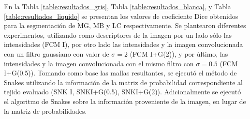 En la Tabla \ref{table:resultados_gris}, Tabla \ref{table:resultados_blanca}, y Tabla \ref{table:resultados_liquido} se presentan los valores de coeficiente Dice obtenidos para la segmentación de MG, MB y LC respectivamente. Se plantearon diferentes experimentos, utilizando como descriptores de la imagen por un lado sólo las intensidades (FCM I), por otro lado las intensidades y la imagen convolucionada con un filtro gaussiano con valor de $\sigma = 2$ (FCM I+G(2)), y por último, las intensidades y la imagen convolucionada con el mismo filtro con $\sigma = 0.5$ (FCM I+G(0.5)). Tomando como base las mallas resultantes, se ejecutó el método de Snakes utilizando la información de la matriz de probabilidad correspondiente al tejido evaluado (SNK I, SNKI+G(0.5), SNKI+G(2)). Adicionalmente se ejecutó el algoritmo de Snakes sobre la información proveniente de la imagen, en lugar de la matriz de probabilidades.

